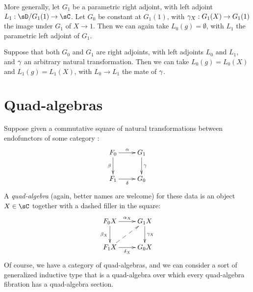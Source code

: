 \documentclass{amsart}
\begin{document}
\begin{eg}
  More generally, let $G_1$ be a parametric right adjoint, with left adjoint $L_1: \sD/G_1(1) \to \sC$.
  Let $G_0$ be constant at $G_1(1)$, with $\gamma_X:G_1(X) \to G_1(1)$ the image under $G_1$ of $X\to 1$.
  Then we can again take $L_0(g)=\emptyset$, with $L_1$ the parametric left adjoint of $G_1$.
\end{eg}

\begin{eg}
  Suppose that both $G_0$ and $G_1$ are right adjoints, with left adjoints $L_0$ and $L_1$, and $\gamma$ an arbitrary natural transformation.
  Then we can take $L_0(g)=L_0(X)$ and $L_1(g)=L_1(X)$, with $L_0 \to L_1$ the mate of $\gamma$.
\end{eg}

\section{Quad-algebras}
\label{sec:quadalg}

Suppose given a commutative square of natural transformations between endofunctors of some category \sC:
\begin{equation}\label{eq:quadinput}
  \vcenter{\xymatrix{
      F_0\ar[r]^\al\ar[d]_\be &
      G_1\ar[d]^\gm\\
      F_1\ar[r]_\de &
      G_0
      }}
\end{equation}
A \emph{quad-algebra} (again, better names are welcome) for these data is an object $X\in\sC$ together with a dashed filler in the square:
\begin{equation}
  \vcenter{\xymatrix{
      F_0 X\ar[r]^{\al_X}\ar[d]_{\be_X} &
      G_1 X\ar[d]^{\gm_X}\\
      F_1 X\ar[r]_{\de_X} \ar@{-->}[ur] &
      G_0 X
      }}
\end{equation}
Of course, we have a category of quad-algebras, and we can consider a sort of generalized inductive type that is a quad-algebra over which every quad-algebra fibration has a quad-algebra section.
\end{document}
